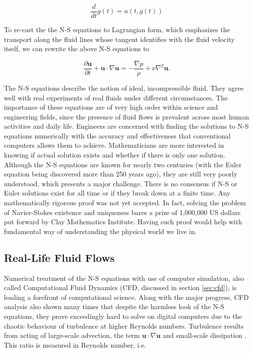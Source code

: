 \begin{equation} 
	\label{eqn:lagrange-hydro}
	\frac{d}{dt} g(t) = u(t, g(t))
\end{equation}

To re-cast the the N-S equations to Lagrangian form, which emphasizes the transport along the fluid lines whose tangent identifies with the fluid velocity itself, we can rewrite the above N-S equations to

\begin{equation} 
	\label{eqn:lagrange-ns-modern}
	\frac{\partial \bm{u}}{\partial t} + \bm{u} \cdot \nabla \bm{u} = - \frac{\nabla p}{\rho} + \nu \nabla^2 \bm{u}.
\end{equation}

The N-S equations describe the notion of ideal, incompressible fluid. They agree well with real experiments of real fluids under different circumstances. The importance of these equations are of very high order within science and engineering fields, since the presence of fluid flows is prevalent across most human activities and daily life. Engineers are concerned with finding the solutions to N-S equations numerically with the accuracy and effectiveness that conventional computers allows them to achieve. Mathematicians are more interested in knowing if actual solution exists and whether if there is only one solution. Although the N-S equations are known for nearly two centuries (with the Euler equation being discovered more than 250 years ago), they are still very poorly understood, which presents a major challenge. There is no consensus if N-S or Euler solutions exist for all time or if they break down at a finite time. Any mathematically rigorous proof was not yet accepted. In fact, solving the problem of Navier-Stokes existence and uniqueness bares a prize of 1,000,000 US dollars put forward by Clay Mathematics Institute. Having such proof would help with fundamental way of understanding the physical world we live in.

\subsection{Real-Life Fluid Flows}
Numerical treatment of the N-S equations with use of computer simulation, also called Computational Fluid Dynamics (CFD, discussed in section \ref{sec:cfd}), is leading a forefront of computational science. Along with the major progress, CFD analysis also shown many times that despite the harmless look of the N-S equations, they prove exceedingly hard to solve on digital computers due to the chaotic behaviour of turbulence at higher Reynolds numbers. Turbulence results from acting of large-scale advection, the term $\bm{u}\cdot \nabla\bm{u}$ and small-scale dissipation \citep{succi2018}. This ratio is measured in Reynolds number, i.e.

